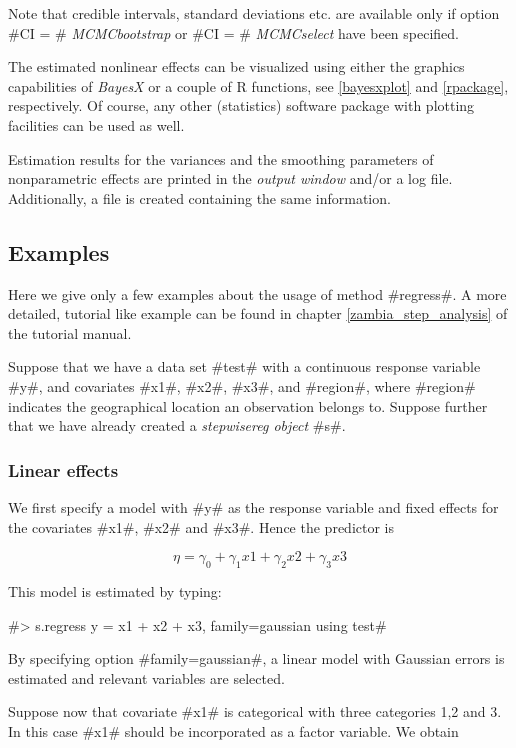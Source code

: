 Note that credible intervals, standard deviations etc. are available only
if option #CI = # {\em MCMCbootstrap} or
#CI = # {\em MCMCselect} have been specified.

The estimated nonlinear effects can be visualized using either the
graphics capabilities of {\em BayesX} or a couple of R
functions,  see \autoref{bayesxplot} and \autoref{rpackage},
respectively. Of course, any other (statistics) software package
with plotting facilities can be used as well.

Estimation results for the variances and the smoothing parameters
of nonparametric effects are printed in the {\em output window}
and/or a log file. Additionally, a file is created containing the
same information.


\subsection{Examples}

Here we give only a few examples about the usage of method
#regress#. A more detailed, tutorial like example can be found in
chapter \ref*{zambia_step_analysis} of the tutorial manual.

Suppose that we have a data set #test# with a continuous response
variable #y#, and covariates #x1#, #x2#, #x3#, and #region#,
where #region# indicates the geographical location an observation belongs to.
Suppose further that we have already created a
{\em stepwisereg object} #s#.

\subsubsection*{Linear effects}

We first specify a model with #y# as the response variable and
fixed effects for the covariates #x1#, #x2# and #x3#. Hence the
predictor is

$$
\eta = \gamma_0 + \gamma_1 x1 + \gamma_2 x2 + \gamma_3 x3
$$

This model is estimated by typing:

#> s.regress y = x1 + x2 + x3, family=gaussian using test#

By specifying option #family=gaussian#, a linear model with Gaussian errors is
estimated and relevant variables are selected.

Suppose now that covariate #x1# is categorical with three categories 1,2 and 3. In this case #x1# should be incorporated as a factor variable. We obtain


